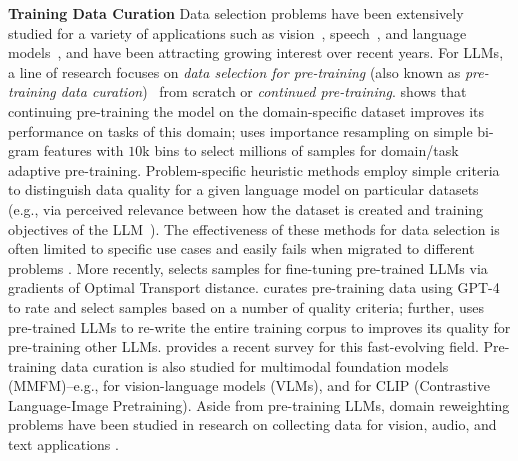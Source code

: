 \documentclass{article} %
\begin{document}
\begin{appendices}{}
\textbf{Training Data Curation} Data selection problems have been extensively studied for a variety of applications such as vision~\citep{coleman2019selection, kaushal2019learning, killamsetty2021grad, mindermann2022prioritized}, speech~\citep{park2022unsupervised, rosenberg2023guided}, and language models~\citep{coleman2019selection, mindermann2022prioritized, aharoni2020unsupervised}, and have been attracting growing interest over recent years. For LLMs, a line of research focuses on \textit{data selection for pre-training} (also known as \textit{pre-training data curation})~\citep{brown2020language, gururangan2020don, hoffmann2022training} from scratch or \textit{continued pre-training}. \citep{gururangan2020don} shows that continuing pre-training the model on the domain-specific dataset improves its performance on tasks of this domain; \citep{xie2023data} uses importance resampling on simple bi-gram features with $10$k bins to select millions of samples for domain/task adaptive pre-training.  Problem-specific heuristic methods employ simple criteria to distinguish data quality for a given language model on particular datasets (e.g., via perceived relevance between how the dataset is created and training objectives of the LLM~\citep{chowdhery2022palm}). The effectiveness of these methods for data selection is often limited to specific use cases and easily fails when migrated to different problems \citep{xie2023data}. More recently, \citep{kang2024get} selects samples for fine-tuning pre-trained LLMs via gradients of Optimal Transport distance.
\citep{wettig2024qurating} curates pre-training data using GPT-4 to rate and select samples based on a number of quality criteria; further, \citep{maini2024rephrasing} uses pre-trained LLMs to re-write the entire training corpus to improves its quality for pre-training other LLMs. \citep{albalak2024survey} provides a recent survey for this fast-evolving field. Pre-training data curation is also studied for multimodal foundation models (MMFM)–e.g.,  \citep{mckinzie2024mm1} for vision-language models (VLMs),  and \citep{schuhmann2021laion,goyal2024science} for
CLIP (Contrastive Language-Image Pretraining). 
Aside from pre-training LLMs, domain reweighting problems have been studied in research on collecting data for vision, audio, and text applications \citep{mahmood2022much, mahmood2022optimizing,kang2023performance, just2023asr}.



\end{appendices}
\end{document}
